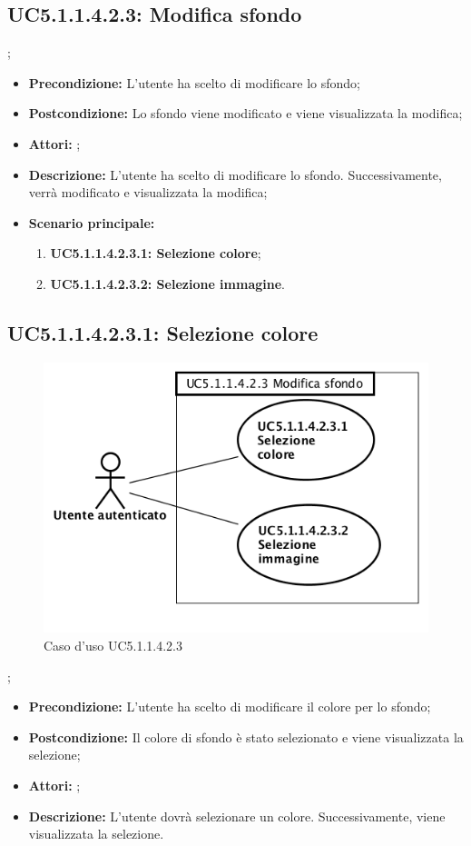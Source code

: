\subsection{ UC5.1.1.4.2.3: Modifica sfondo}
;
\begin{itemize}
	\item \textbf{Precondizione:} L'utente ha scelto di modificare lo sfondo;
	\item \textbf{Postcondizione:} Lo sfondo viene modificato e viene visualizzata la modifica;
	\item \textbf{Attori:} ;
	\item \textbf{Descrizione:} L'utente ha scelto di modificare lo sfondo.  Successivamente, verrà modificato e visualizzata la modifica;
	\item \textbf{Scenario principale:}
	\begin{enumerate}
		\item \textbf{ UC5.1.1.4.2.3.1: Selezione colore};
		\item \textbf{ UC5.1.1.4.2.3.2: Selezione immagine}.
	\end{enumerate}
\end{itemize}
\subsection{ UC5.1.1.4.2.3.1: Selezione colore}

\begin{figure}[h]
	\begin{center}
	\includegraphics[scale=0.4]{diagram/UC5-1-1-4-2-3.png}
	\caption{Caso d'uso UC5.1.1.4.2.3}
	\end{center}
\end{figure};
\begin{itemize}
	\item \textbf{Precondizione:} L'utente ha scelto di modificare il colore per lo sfondo;
	\item \textbf{Postcondizione:} Il colore di sfondo è stato selezionato e viene visualizzata la selezione;
	\item \textbf{Attori:} ;
	\item \textbf{Descrizione:} L'utente dovrà selezionare un colore.  Successivamente, viene visualizzata la selezione.
\end{itemize}
